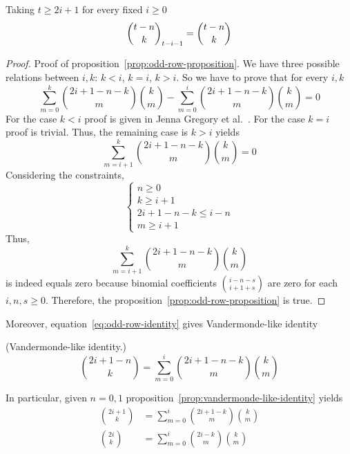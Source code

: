 Taking $t \geq 2i+1$ for every fixed $i \geq 0$
\begin{align*}
    \binom{t-n}{k}_{t-i-1}= \binom{t-n}{k}
\end{align*}
\begin{proof}
    Proof of proposition~\eqref{prop:odd-row-proposition}.
    We have three possible relations between $i,k$: $k<i$, $k=i$, $k > i$.
    So we have to prove that for every $i,k$
    \begin{equation*}
        \sum_{m=0}^{k} \binom{2i+1-n-k}{m} \binom{k}{m} - \sum_{m=0}^{i} \binom{2i+1-n-k}{m} \binom{k}{m} = 0
    \end{equation*}
    For the case $k<i$ proof is given in Jenna Gregory et al.~\cite{gregory2023iterated}.
    For the case $k=i$ proof is trivial.
    Thus, the remaining case is $k>i$ yields
    \begin{equation*}
        \sum_{m=i+1}^{k} \binom{2i+1-n-k}{m} \binom{k}{m} = 0
    \end{equation*}
    Considering the constraints,
    \begin{equation*}
        \begin{cases}
            n \geq 0 \\
            k \geq i+1 \\
            2i+1-n-k \leq i-n \\
            m \geq i+1
        \end{cases}
    \end{equation*}
    Thus,
    \begin{equation*}
        \sum_{m=i+1}^{k} \binom{2i+1-n-k}{m} \binom{k}{m}
    \end{equation*}
    is indeed equals zero because binomial coefficients $\binom{i-n-s}{i+1+s}$ are zero for each $i, n, s \geq 0$.
    Therefore, the proposition~\eqref{prop:odd-row-proposition} is true.
\end{proof}
Moreover, equation~\eqref{eq:odd-row-identity} gives Vandermonde-like identity
\begin{proposition} (Vandermonde-like identity.)
    \label{prop:vandermonde-like-identity}
    \begin{equation*}
        \binom{2i+1-n}{k} = \sum_{m=0}^{i} \binom{2i+1-n-k}{m} \binom{k}{m}
    \end{equation*}
\end{proposition}
In particular, given $n=0,1$ proposition~\eqref{prop:vandermonde-like-identity} yields
\begin{align*}
    \binom{2i+1}{k} &= \sum_{m=0}^{i} \binom{2i+1-k}{m} \binom{k}{m} \\
    \binom{2i}{k}   &= \sum_{m=0}^{i} \binom{2i-k}{m} \binom{k}{m}
\end{align*}

